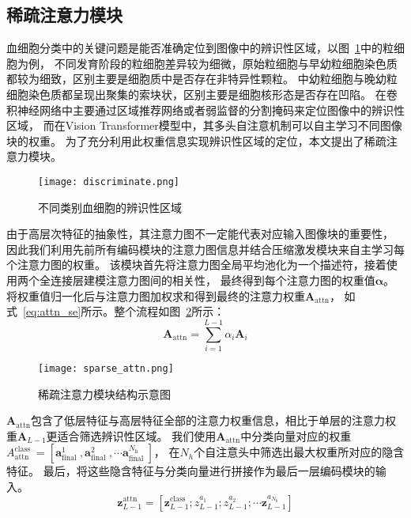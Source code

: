 \subsection{稀疏注意力模块}
血细胞分类中的关键问题是能否准确定位到图像中的辨识性区域，以图~\ref{fig:discriminate}中的粒细胞为例，
不同发育阶段的粒细胞差异较为细微，原始粒细胞与早幼粒细胞染色质都较为细致，区别主要是细胞质中是否存在非特异性颗粒。
中幼粒细胞与晚幼粒细胞染色质都呈现出聚集的索块状，区别主要是细胞核形态是否存在凹陷。
在卷积神经网络中主要通过区域推荐网络或者弱监督的分割掩码来定位图像中的辨识性区域，
而在Vision Transformer模型中，其多头自注意机制可以自主学习不同图像块的权重。
为了充分利用此权重信息实现辨识性区域的定位，本文提出了稀疏注意力模块。
\begin{figure}[htbp] 
   \centering   
   \texttt{[image: discriminate.png]}   
   \caption{不同类别血细胞的辨识性区域}   
   \label{fig:discriminate} 
\end{figure}  

由于高层次特征的抽象性，其注意力图不一定能代表对应输入图像块的重要性，
因此我们利用先前所有编码模块的注意力图信息并结合压缩激发模块来自主学习每个注意力图的权重。
该模块首先将注意力图全局平均池化为一个描述符，接着使用两个全连接层建模注意力图间的相关性，
最终得到每个注意力图的权重值$\mathbf{\alpha}$。将权重值归一化后与注意力图加权求和得到最终的注意力权重$\boldsymbol{A}_{\mathrm{attn}}$，
如式~\ref{eq:attn_se}所示。整个流程如图~\ref{fig:sparse_attn}所示：
\begin{equation}
  \boldsymbol{A}_{\mathrm{attn}}=\sum_{i=1}^{L-1} \alpha_{i} \boldsymbol{A}_{i}
  \label{eq:attn_se}
\end{equation}

\begin{figure}[htbp] 
   \centering   
   \texttt{[image: sparse\_attn.png]}   
   \caption{稀疏注意力模块结构示意图}   
   \label{fig:sparse_attn} 
\end{figure}  

$\boldsymbol{A}_{\mathrm{attn}}$包含了低层特征与高层特征全部的注意力权重信息，相比于单层的注意力权重$\boldsymbol{A}_{L-1}$更适合筛选辨识性区域。
我们使用$\boldsymbol{A}_{\mathrm{attn}}$中分类向量对应的权重$A_{\mathrm{attn}}^{\text {class }}=\left[\boldsymbol{a}_{\text {final }}^{1}, \boldsymbol{a}_{\text {final }}^{2}, \cdots \boldsymbol{a}_{\text {final }}^{N_{\mathrm{h}}}\right]$，
在$N_h$个自注意头中筛选出最大权重所对应的隐含特征。
最后，将这些隐含特征与分类向量进行拼接作为最后一层编码模块的输入。
\begin{equation}
  \mathbf{z}_{L-1}^{\mathrm{attn}}=\left[\mathbf{z}_{L-1}^{\text {class }} ; z_{L-1}^{a_{1}} ; z_{L-1}^{a_{2}} ; \cdots \mathbf{z}_{L-1}^{a_{N_{h}}}\right]
  \label{eq:attn_se_out}
\end{equation}

